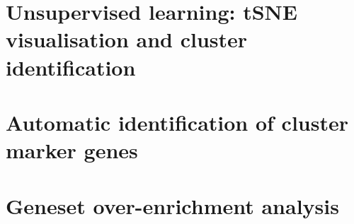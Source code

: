 \section{Unsupervised learning: tSNE visualisation and cluster identification}


\section{Automatic identification of cluster marker genes}


\section{Geneset over-enrichment analysis}


